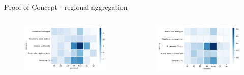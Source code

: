 \documentclass[9pt]{beamer}
\begin{document}
\begin{frame}{Proof of Concept - regional aggregation}

\begin{columns}
	\begin{column}{0.5\linewidth}
		\begin{figure}
			\includegraphics[width=\linewidth]{../plots/original_category_continent}
		\end{figure}
	\end{column}
	\begin{column}{0.5\linewidth}
		\begin{figure}
			\includegraphics[width=\linewidth]{../plots/predicted_category_continent}
		\end{figure}
	\end{column}
\end{columns}

\end{frame}
\end{document}
